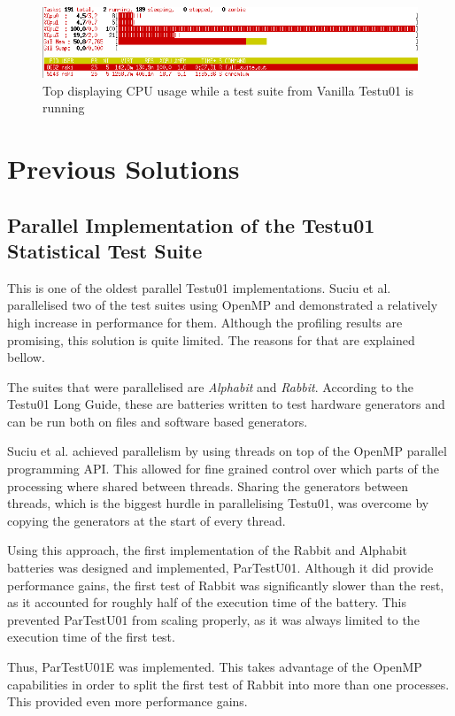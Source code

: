 \begin{figure}[h]
\includegraphics[scale=0.5]{top_full_suite}
\caption{Top displaying CPU usage while a test suite from Vanilla Testu01 is running\cite{full-suite}}
\label{fig:cpu_serial_tests}
\end{figure}

\section{Previous Solutions}
\subsection{Parallel Implementation of the Testu01 Statistical Test Suite}
This is one of the oldest parallel Testu01 implementations. Suciu et al. parallelised two of the test suites using OpenMP and demonstrated a relatively high increase in performance for them. Although the profiling results are promising, this solution is quite limited. The reasons for that are explained bellow.

The suites that were parallelised are \textit{Alphabit} and \textit{Rabbit}. According to the Testu01 Long Guide\cite{longguide-alphabit}, these are batteries written to test hardware generators and can be run both on files and software based generators.

Suciu et al. achieved parallelism by using threads on top of the OpenMP parallel programming API\cite{openmp}. This allowed for fine grained control over which parts of the processing where shared between threads. Sharing the generators between threads, which is the biggest hurdle in parallelising Testu01, was overcome by copying the generators at the start of every thread. 

Using this approach, the first implementation of the Rabbit and Alphabit batteries was designed and implemented, ParTestU01. Although it did provide performance gains, the first test of Rabbit was significantly slower than the rest, as it accounted for roughly half of the execution time of the battery. This prevented ParTestU01 from scaling properly, as it was always limited to the execution time of the first test.

Thus, ParTestU01E was implemented. This takes advantage of the OpenMP capabilities in order to split the first test of Rabbit into more than one processes. This provided even more performance gains.

